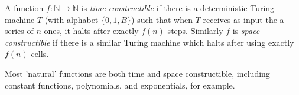 \documentclass[12pt]{article}
\begin{document}
A function $f:\mathbb{N}\rightarrow\mathbb{N}$ is \emph{time constructible} if there is a deterministic Turing machine $T$ (with alphabet $\{0,1,B\}$) such that when $T$ receives as input the a series of $n$ ones, it halts after exactly $f(n)$ steps.  Similarly $f$ is \emph{space constructible} if there is a similar Turing machine which halts after using exactly $f(n)$ cells.

Most 'natural' functions are both time and space constructible, including constant functions, polynomials, and exponentials, for example.
\end{document}
